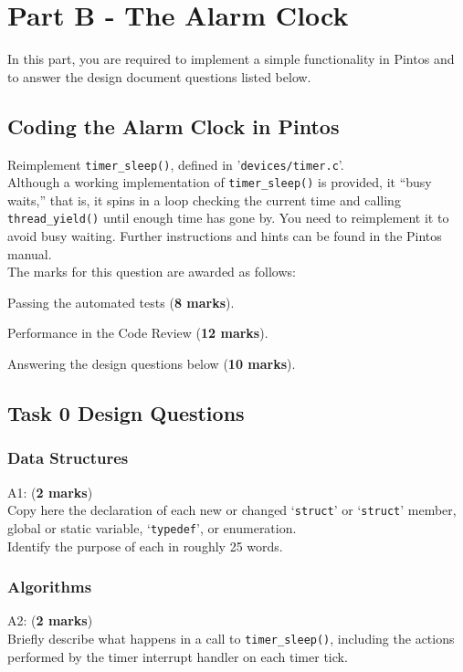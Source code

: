 \documentclass[a4paper,12pt]{article}
\newcommand{\shell}[1]{\lstinline!#1!}
\begin{document}
\section*{Part B - The Alarm Clock}

In this part, you are required to implement a simple functionality in Pintos and to answer the design document questions listed below.

\subsection*{Coding the Alarm Clock in Pintos} 
Reimplement \shell{timer_sleep()}, defined in '\shell{devices/timer.c}’.\\ 

\noindent Although a working implementation of \shell{timer_sleep()} is provided, it “busy waits,” that is, 
it spins in a loop checking the current time and calling \shell{thread_yield()} until enough time has gone by. 
You need to reimplement it to avoid busy waiting. 
Further instructions and hints can be found in the Pintos manual.\\

\noindent The marks for this question are awarded as follows:

Passing the automated tests ({\bf 8 marks}). 

Performance in the Code Review ({\bf 12 marks}). 

Answering the design questions below ({\bf 10 marks}).

\subsection*{Task 0 Design Questions}

\subsubsection*{Data Structures}
A1: ({\bf 2 marks}) \\
Copy here the declaration of each new or changed `\shell{struct}' or `\shell{struct}' member, 
global or static variable, `\shell{typedef}', or enumeration. \\
Identify the purpose of each in roughly 25 words.

\subsubsection*{Algorithms}
A2: ({\bf 2 marks}) \\
Briefly describe what happens in a call to \shell{timer_sleep()}, including the actions performed by the timer interrupt handler on each timer tick. \\
\end{document}
